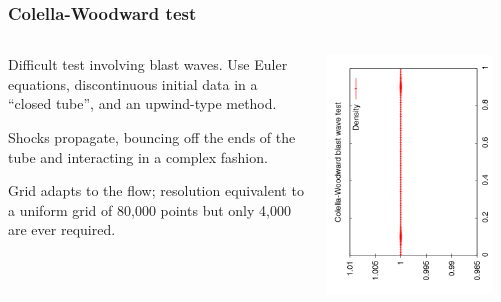 \documentclass{beamer}
\begin{document}
\begin{frame}
  \frametitle{Colella-Woodward test}

  \begin{columns}
    \begin{column}{0.5\textwidth}
      Difficult test involving blast waves. Use Euler equations,
      discontinuous initial data in a ``closed tube'', and an
      upwind-type method. \pause

      \vspace{1ex}

      Shocks propagate, \pause bouncing off the ends of the tube \pause
      and interacting \pause in a complex fashion. \pause

      \vspace{1ex}

      Grid adapts to the flow; resolution equivalent to a uniform grid
      of 80,000 points but only 4,000 are ever required.
    \end{column}
    \begin{column}{0.5\textwidth}
      \begin{overlayarea}{\textwidth}{0.9\textheight}
        {
          \includegraphics[angle=-90,width=0.9\textwidth]{figures/AMR_Density_0}\\
}
\end{overlayarea}
\end{column}
\end{columns}
\end{frame}
\end{document}
